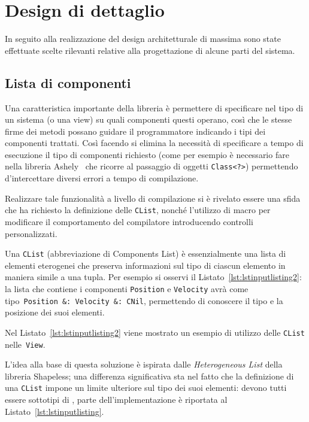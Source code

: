 \chapter{Design di dettaglio}\label{ch:design-di-dettaglio}
In seguito alla realizzazione del design architetturale di massima sono state effettuate scelte rilevanti
relative alla progettazione di alcune parti del sistema.

\section{Lista di componenti}\label{sec:lista-di-componenti}
Una caratteristica importante della libreria è permettere di specificare nel tipo di un sistema (o una view)
su quali componenti questi operano, così che le stesse firme dei metodi possano guidare il programmatore indicando i
tipi dei componenti trattati.
Così facendo si elimina la necessità di specificare a tempo di esecuzione il tipo di componenti richiesto (come per
esempio è necessario fare nella libreria Ashely~\cite{ashley} che ricorre al passaggio di oggetti \texttt{Class<?>})
permettendo d'intercettare diversi errori a tempo di compilazione.

Realizzare tale funzionalità a livello di compilazione si è rivelato essere una sfida che ha richiesto la definizione
delle \texttt{CList}, nonché l’utilizzo di macro per modificare il comportamento del compilatore introducendo controlli
personalizzati.

Una \texttt{CList} (abbreviazione di Components List) è essenzialmente una lista di elementi eterogenei che preserva
informazioni sul tipo di ciascun elemento in maniera simile a una tupla.
Per esempio si osservi il Listato~\ref{lst:lstinputlisting2}: la lista che contiene
i componenti \texttt{Position} e \texttt{Velocity} avrà come tipo~\texttt{Position~\&:~Velocity~\&:~CNil}, permettendo di conoscere il
tipo e la posizione dei suoi elementi.

Nel Listato~\ref{lst:lstinputlisting2} viene mostrato un esempio di utilizzo delle \texttt{CList} nelle~\texttt{View}.


L’idea alla base di questa soluzione è ispirata dalle \textit{Heterogeneous List} della libreria
Shapeless\cite{shapeless}; una differenza significativa sta nel fatto che la definizione di una \texttt{CList} impone un
limite ulteriore sul tipo dei suoi elementi: devono tutti essere sottotipi di \Component, parte dell’implementazione è
riportata al Listato~\ref{lst:lstinputlisting}.

